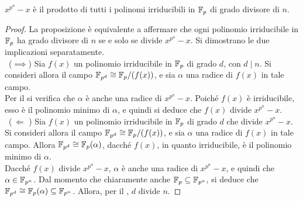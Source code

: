 \documentclass[11pt]{scrbook}
\begin{document}
\begin{theorem}
    $x^{p^n}-x$ è il prodotto di tutti i polinomi irriducibili in $\mathbb{F}_p$
    di grado divisore di $n$.
\end{theorem}

\begin{proof}
    La proposizione è equivalente a affermare che ogni polinomio irriducibile in $\mathbb{F}_p$
    ha grado divisore di $n$ se e solo se divide $x^{p^n}-x$. Si dimostrano le
    due implicazioni separatamente. \\

    \ ($\implies$)\; Sia $f(x)$ un polinomio irriducibile in $\mathbb{F}_p$ di grado $d$, con
    $d \mid n$. Si consideri allora il campo $\mathbb{F}_{p^d} \cong \mathbb{F}_p/(f(x))$, e
    sia $\alpha$ una radice di $f(x)$ in tale campo. \\

    Per il  si verifica che $\alpha$ è anche una radice
    di $x^{p^n}-x$. Poiché $f(x)$ è irriducibile, esso è il polinomio minimo
    di $\alpha$, e quindi si deduce che $f(x)$ divide $x^{p^n}-x$. \\

    \ ($\,\Longleftarrow\,\,$)\; Sia $f(x)$ un polinomio irriducibile in $\mathbb{F}_p$ di grado
    $d$ che divide $x^{p^n}-x$. Si consideri allora il campo $\mathbb{F}_{p^d} \cong \mathbb{F}_p/(f(x))$,
    e sia $\alpha$ una radice di $f(x)$ in tale campo. Allora $\mathbb{F}_{p^d} \cong
        \mathbb{F}_p(\alpha)$, dacché $f(x)$, in quanto irriducibile, è il polinomio minimo
    di $\alpha$. \\

    Dacché $f(x)$ divide $x^{p^n}-x$, $\alpha$ è anche una radice
    di $x^{p^n}-x$, e quindi che $\alpha \in \mathbb{F}_{p^n}$. Dal momento che chiaramente
    anche $\mathbb{F}_p \subseteq \mathbb{F}_{p^n}$, si deduce che $\mathbb{F}_{p^d} \cong \mathbb{F}_p(\alpha) \subseteq
        \mathbb{F}_{p^n}$. Allora, per il , $d$ divide $n$.
\end{proof}
\end{document}

